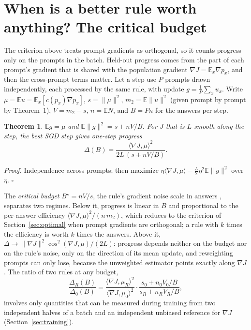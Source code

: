 \documentclass[11pt]{article}
\newtheorem{theorem}{Theorem}
\newcommand{\E}{\mathbb{E}}
\begin{document}
\section{When is a better rule worth anything? The critical budget}\label{sec:regime}
The criterion above treats prompt gradients as orthogonal, so it counts progress only on the prompts in the batch. Held-out progress comes from the part of each prompt's gradient that is shared with the population gradient $\nabla J=\E_x\nabla p_x$, and then the cross-prompt terms matter. Let a step use $P$ prompts drawn independently, each processed by the same rule, with update $g=\frac1P\sum_x u_x$. Write $\mu=\E u=\E_x[c(p_x)\nabla p_x]$, $s=\|\mu\|^2$, $m_2=\E\|u\|^2$ (given prompt by prompt by Theorem~1), $V=m_2-s$, $n=\E N$, and $B=Pn$ for the answers per step.

\begin{theorem}
$\E g=\mu$ and $\E\|g\|^2=s+nV/B$. For $J$ that is $L$-smooth along the step, the best SGD step gives one-step progress
\[
\Delta(B)=\frac{\langle\nabla J,\mu\rangle^2}{2L\,(s+nV/B)}.
\]
\end{theorem}
\emph{Proof.} Independence across prompts; then maximize $\eta\langle\nabla J,\mu\rangle-\frac{L}{2}\eta^2\E\|g\|^2$ over $\eta$. $\square$

The \emph{critical budget} $B^\star=nV/s$, the rule's gradient noise scale in answers \citep{mccandlish2018empirical}, separates two regimes. Below it, progress is linear in $B$ and proportional to the per-answer efficiency $\langle\nabla J,\mu\rangle^2/(n\,m_2)$, which reduces to the criterion of Section~\ref{sec:optimal} when prompt gradients are orthogonal; a rule with $k$ times the efficiency is worth $k$ times the answers. Above it, $\Delta\to\|\nabla J\|^2\cos^2(\nabla J,\mu)/(2L)$: progress depends neither on the budget nor on the rule's noise, only on the direction of its mean update, and reweighting prompts can only lose, because the unweighted estimator points exactly along $\nabla J$. The ratio of two rules at any budget,
\[
\frac{\Delta_R(B)}{\Delta_0(B)}=\frac{\langle\nabla J,\mu_R\rangle^2}{\langle\nabla J,\mu_0\rangle^2}\cdot\frac{s_0+n_0V_0/B}{s_R+n_RV_R/B},
\]
involves only quantities that can be measured during training from two independent halves of a batch and an independent unbiased reference for $\nabla J$ (Section~\ref{sec:training}).
\end{document}
